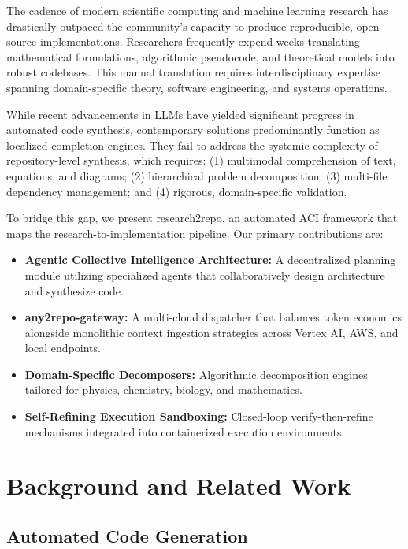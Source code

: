 \documentclass[10pt]{article}
\begin{document}
The cadence of modern scientific computing and machine learning research has drastically outpaced the community's capacity to produce reproducible, open-source implementations. Researchers frequently expend weeks translating mathematical formulations, algorithmic pseudocode, and theoretical models into robust codebases. This manual translation requires interdisciplinary expertise spanning domain-specific theory, software engineering, and systems operations.

While recent advancements in LLMs have yielded significant progress in automated code synthesis, contemporary solutions predominantly function as localized completion engines. They fail to address the systemic complexity of repository-level synthesis, which requires: (1) multimodal comprehension of text, equations, and diagrams; (2) hierarchical problem decomposition; (3) multi-file dependency management; and (4) rigorous, domain-specific validation.

To bridge this gap, we present research2repo, an automated ACI framework that maps the research-to-implementation pipeline. Our primary contributions are:

\begin{itemize}
    \item \textbf{Agentic Collective Intelligence Architecture:} A decentralized planning module utilizing specialized agents that collaboratively design architecture and synthesize code.
    \item \textbf{any2repo-gateway:} A multi-cloud dispatcher that balances token economics alongside monolithic context ingestion strategies across Vertex AI, AWS, and local endpoints.
    \item \textbf{Domain-Specific Decomposers:} Algorithmic decomposition engines tailored for physics, chemistry, biology, and mathematics.
    \item \textbf{Self-Refining Execution Sandboxing:} Closed-loop verify-then-refine mechanisms integrated into containerized execution environments.
\end{itemize}

\section{Background and Related Work}

\subsection{Automated Code Generation}
\end{document}
